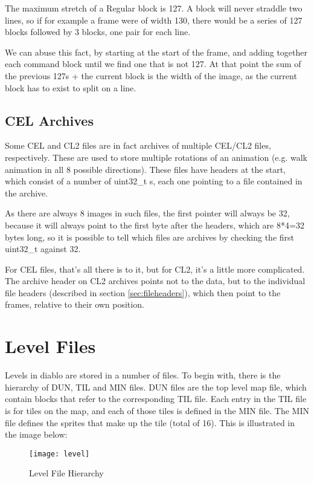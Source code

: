  	The maximum stretch of a Regular block is 127. A block will never straddle two lines, so if for example a frame were of width 130, there would be a series of 127 blocks followed by 3 blocks, one pair for each line.
 	
 	We can abuse this fact, by starting at the start of the frame, and adding together each command block until we find one that is not 127. At that point the sum of the previous 127s + the current block is the width of the image, as the current block has to exist to split on a line.
 	
 	\subsection{CEL Archives}
 	Some CEL and CL2 files are in fact archives of multiple CEL/CL2 files, respectively. These are used to store multiple rotations of an animation (e.g. walk animation in all 8 possible directions). These files have headers at the start, which consist of a number of uint32\_t s, each one pointing to a file contained in the archive.
 	
 	As there are always 8 images in such files, the first pointer will always be 32, because it will always point to the first byte after the headers, which are 8*4=32 bytes long, so it is possible to tell which files are archives by checking the first uint32\_t against 32.
 	
 	For CEL files, that's all there is to it, but for CL2, it's a little more complicated. The archive header on CL2 archives points not to the data, but to the individual file headers (described in section \ref{sec:fileheaders}), which then point to the frames, relative to their own position.

\newpage

\section{Level Files}
    Levels in diablo are stored in a number of files. To begin with, there is the hierarchy of DUN, TIL and MIN files.
    DUN files are the top level map file, which contain blocks that refer to the corresponding TIL file. Each entry in the TIL file is for tiles on the map, and each of those tiles is defined in the MIN file. The MIN file defines the sprites that make up the tile (total of 16). This is illustrated in the image below:\\
    
    \begin{figure}[H]
    	\centering
    	\texttt{[image: level]}
    	\caption{Level File Hierarchy}
   	\end{figure}
   	
